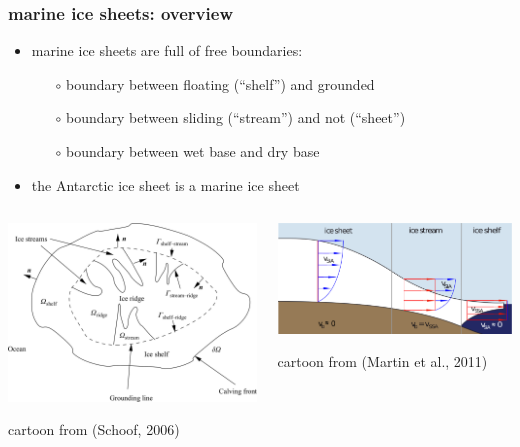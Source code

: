 \documentclass{beamer}
\begin{document}
\begin{frame}
  \frametitle{marine ice sheets: overview}

\begin{itemize}
\item marine ice sheets are full of free boundaries:
  \begin{itemize}
  \item[$\circ$] boundary between floating (``shelf'') and grounded
  \item[$\circ$] boundary between sliding (``stream'') and not (``sheet'')
  \item[$\circ$] boundary between wet base and dry base
  \end{itemize}
\item the Antarctic ice sheet is a marine ice sheet
\end{itemize}

\begin{columns}
\begin{column}{0.5\textwidth}
\includegraphics[width=1.0\textwidth]{schoof-planform}

\tiny cartoon from (Schoof, 2006)
\end{column}
\begin{column}{0.5\textwidth}
\includegraphics[width=1.0\textwidth]{figs/martin-cartoon}

\vspace{10mm}
\tiny \hfill cartoon from (Martin et al., 2011)
\end{column}
\end{columns}

\end{frame}
\end{document}
